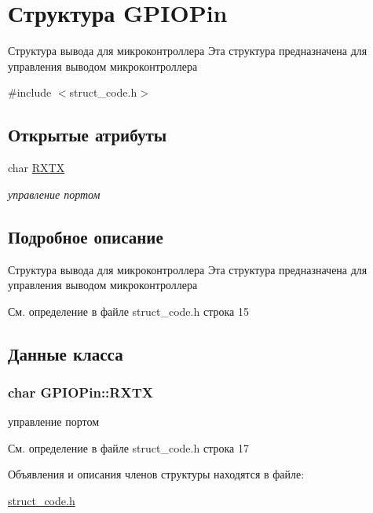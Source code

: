 \hypertarget{struct_g_p_i_o_pin}{}\section{Структура G\+P\+I\+O\+Pin}
\label{struct_g_p_i_o_pin}


Структура вывода для микроконтроллера Эта структура предназначена для управления выводом микроконтроллера  




{\ttfamily \#include $<$struct\+\_\+code.\+h$>$}

\subsection*{Открытые атрибуты}
\begin{DoxyCompactItemize}
\item 
char \hyperlink{struct_g_p_i_o_pin_a7fb5dbc1ae96fdcf98d3a2aa27383460}{R\+X\+T\+X}
\begin{DoxyCompactList}\small\item\em управление портом \end{DoxyCompactList}\end{DoxyCompactItemize}


\subsection{Подробное описание}
Структура вывода для микроконтроллера Эта структура предназначена для управления выводом микроконтроллера 

См. определение в файле struct\+\_\+code.\+h строка 15



\subsection{Данные класса}
\hypertarget{struct_g_p_i_o_pin_a7fb5dbc1ae96fdcf98d3a2aa27383460}{}
\subsubsection[{R\+X\+T\+X}]{\setlength{\rightskip}{0pt plus 5cm}char G\+P\+I\+O\+Pin\+::\+R\+X\+T\+X}\label{struct_g_p_i_o_pin_a7fb5dbc1ae96fdcf98d3a2aa27383460}


управление портом 



См. определение в файле struct\+\_\+code.\+h строка 17



Объявления и описания членов структуры находятся в файле\+:\begin{DoxyCompactItemize}
\item 
\hyperlink{struct__code_8h}{struct\+\_\+code.\+h}\end{DoxyCompactItemize}
